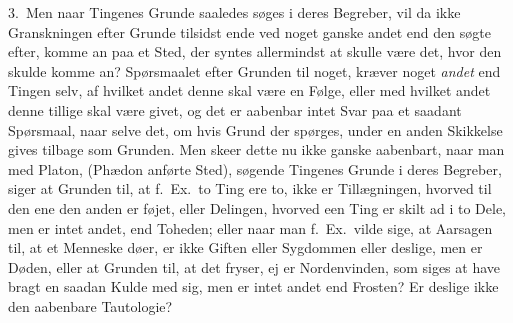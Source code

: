 \documentclass[12pt,a4paper]{book}
\newcommand{\apage}[1]{\marginnote{\footnotesize\textit{[#1]}}}
\begin{document}
3.~Men naar Tingenes Grunde saaledes søges i deres Begreber, vil da ikke
Granskningen efter Grunde tilsidst ende ved noget ganske andet end den søgte
efter, komme an paa et Sted, der syntes allermindst at skulle være det, hvor den
skulde komme an? Spørsmaalet efter Grunden til noget, kræver noget \emph{andet}
end Tingen selv, af hvilket andet denne skal være en Følge, eller med hvilket
andet denne tillige skal være givet, og det er aabenbar intet Svar paa et saadant
Spørsmaal, naar selve det, om hvis Grund der spørges, under en anden Skikkelse
gives tilbage som  \apage{96} Grunden. Men skeer dette nu ikke ganske aabenbart, naar man med
Platon, (Phædon anførte Sted), søgende Tingenes Grunde i deres Begreber, siger at
Grunden til, at f.~Ex.\ to Ting ere to, ikke er Tillægningen, hvorved til den ene
den anden er føjet, eller Delingen, hvorved een Ting er skilt ad i to Dele, men er
intet andet, end Toheden; eller naar man f.~Ex.\ vilde sige, at Aarsagen til, at
et Menneske døer, er ikke Giften eller Sygdommen eller deslige, men er Døden,
eller at Grunden til, at det fryser, ej er Nordenvinden, som siges at have bragt
en saadan Kulde med sig, men er intet andet end Frosten? Er deslige ikke den
aabenbare Tautologie?
\end{document}
